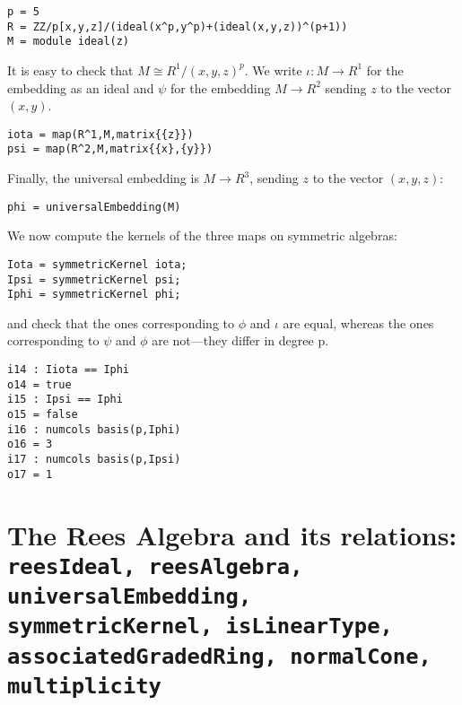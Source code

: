 \documentclass[twoside,12pt, leqno]{amsart}
\begin{document}
\begin{footnotesize}
  \begin{verbatim}
p = 5
R = ZZ/p[x,y,z]/(ideal(x^p,y^p)+(ideal(x,y,z))^(p+1))
M = module ideal(z) 
 \end{verbatim}
\end{footnotesize}
\begin{normalsize}
    It is easy to check that $M \cong R^1/(x,y,z)^p$.
     We write $\iota: M\to R^1$ for the embedding as an ideal
     and $\psi$ for the embedding $M \to R^2$ sending $z$ to the vector $(x,y)$.
\end{normalsize}
 \begin{verbatim}
iota = map(R^1,M,matrix{{z}}) 
psi = map(R^2,M,matrix{{x},{y}})
\end{verbatim}
\begin{normalsize}
      Finally, the universal embedding is $M \to R^3$,
     sending $z$ to the vector $(x,y,z)$:
\end{normalsize}
\begin{verbatim}
phi = universalEmbedding(M)
\end{verbatim}
\begin{normalsize}
     We now compute the kernels of the three maps
     on symmetric algebras:
\end{normalsize}
 \begin{verbatim}
Iota = symmetricKernel iota;
Ipsi = symmetricKernel psi;
Iphi = symmetricKernel phi;
\end{verbatim}
\begin{footnotesize}
\begin{normalsize}
      and check that the ones corresponding to $\phi$ and $\iota$
     are equal, whereas the ones corresponding to $\psi$ and $\phi$
     are not---they differ in degree p.
\end{normalsize}
 \begin{verbatim}
i14 : Iiota == Iphi    
o14 = true
i15 : Ipsi == Iphi
o15 = false
i16 : numcols basis(p,Iphi) 
o16 = 3
i17 : numcols basis(p,Ipsi)
o17 = 1
\end{verbatim}
\end{footnotesize}


\section{The Rees Algebra and its relations:\\ {\tt reesIdeal, reesAlgebra, universalEmbedding, symmetricKernel, isLinearType,
associatedGradedRing, normalCone, multiplicity}}
\end{document}

